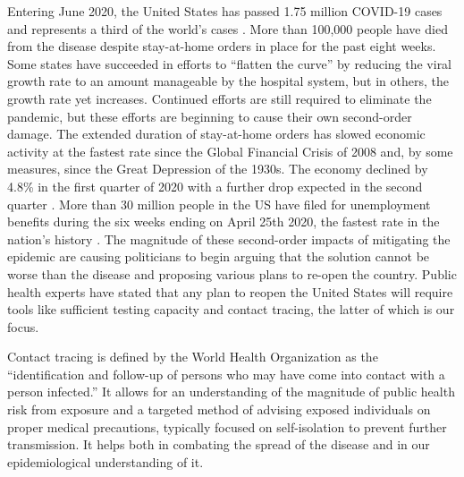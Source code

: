 \documentclass{article}
\begin{document}
Entering June 2020, the United States has passed 1.75 million COVID-19 cases and represents a third of the world’s cases \cite{Coronavirus_US}. More than 100,000 people have died from the disease despite stay-at-home orders in place for the past eight weeks. Some states have succeeded in efforts to “flatten the curve” by reducing the viral growth rate to an amount manageable by the hospital system, but in others, the growth rate yet increases. Continued efforts are still required to eliminate the pandemic, but these efforts are beginning to cause their own second-order damage. The extended duration of stay-at-home orders has slowed economic activity at the fastest rate since the Global Financial Crisis of 2008 and, by some measures, since the Great Depression of the 1930s. The economy declined by 4.8\% in the first quarter of 2020 with a further drop expected in the second quarter \cite{GDP_FRED}. More than 30 million people in the US have filed for unemployment benefits during the six weeks ending on April 25th 2020, the fastest rate in the nation’s history \cite{Unemployment_US}. The magnitude of these second-order impacts of mitigating the epidemic are causing politicians to begin arguing that the solution cannot be worse than the disease and proposing various plans to re-open the country. Public health experts have stated that any plan to reopen the United States will require tools like sufficient testing capacity and contact tracing, the latter of which is our focus.

Contact tracing is defined by the World Health Organization as the “identification and follow-up of persons who may have come into contact with a person infected.” \cite{ContactTracing_WHO} It allows for an understanding of the magnitude of public health risk from exposure and a targeted method of advising exposed individuals on proper medical precautions, typically focused on self-isolation to prevent further transmission. It helps both in combating the spread of the disease and in our epidemiological understanding of it.
\end{document}
